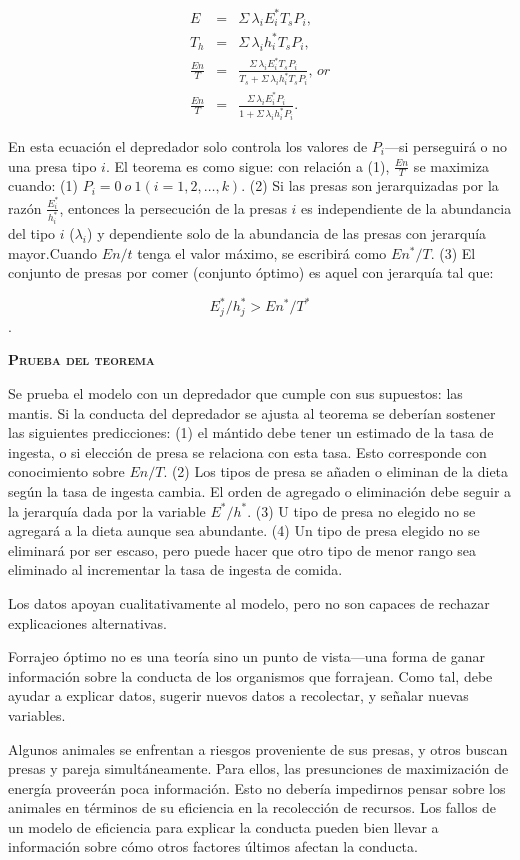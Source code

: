 \documentclass[a4paper,12pt]{article}
\begin{document}
\begin{eqnarray*}
        E&=&\Sigma\, \lambda_{i}E_{i}^{*}T_{s}P_{i},\\
        T_{h}&=&\Sigma\, \lambda_{i}h_{i}^{*}T_{s}P_{i},\\
        \frac{En}{T}&=&\frac{
                \Sigma\, \lambda_{i}E_{i}^{*}T_{s}P_{i}
        }{
                T_{s} + \Sigma\, \lambda_{i}h_{i}^{*}T_{s}P_{i}
        },\, or\\
        \frac{En}{T}&=&\frac{
                \Sigma\, \lambda_{i}E_{i}^{*}P_{i}
        }{
                1 + \Sigma\, \lambda_{i}h_{i}^{*}P_{i}
        }.
\end{eqnarray*}

En esta ecuación el depredador solo controla los valores de $P_{i}$---si perseguirá o no una presa tipo $i$. El teorema es como sigue: con relación a (1), $\frac{En}{T}$ se maximiza cuando: (1) $P_{i} = 0\ o\ 1 (i=1,2,\ldots, k)$. (2) Si las presas son jerarquizadas por la razón $\frac{E_{i}^{*}}{h_{i}^{*}}$, entonces la persecución de la presas $i$ es independiente de la abundancia del tipo $i$ ($\lambda_{i}$) y dependiente solo de la abundancia de las presas con jerarquía mayor.Cuando $En/t$ tenga el valor máximo, se escribirá como $En^{*}/T$. (3) El conjunto de presas por comer (conjunto óptimo) es aquel con jerarquía tal que:

\[
        E_{j}^{*}/h_{j}^{*} > En^{*}/T^{*}
\].

{\scshape\bfseries Prueba del teorema}

Se prueba el modelo con un depredador que cumple con sus supuestos: las mantis. Si la conducta del depredador se ajusta al teorema se deberían sostener las siguientes predicciones: (1) el mántido debe tener un estimado de la tasa de ingesta, o si elección de presa se relaciona con esta tasa. Esto corresponde con conocimiento sobre $En/T$. (2) Los tipos de presa se añaden o eliminan de la dieta según la tasa de ingesta cambia. El orden de agregado o eliminación debe seguir a la jerarquía dada por la variable $E^{*}/h^{*}$. (3) U tipo de presa no elegido no se agregará a la dieta aunque sea abundante. (4) Un tipo de presa elegido no se eliminará por ser escaso, pero puede hacer que otro tipo de menor rango sea eliminado al incrementar la tasa de ingesta de comida.

Los datos apoyan cualitativamente al modelo, pero no son capaces de rechazar explicaciones alternativas.

Forrajeo óptimo no es una teoría sino un punto de vista---una forma de ganar información sobre la conducta de los organismos que forrajean. Como tal, debe ayudar a explicar datos, sugerir nuevos datos a recolectar, y señalar nuevas variables.

Algunos animales se enfrentan a riesgos proveniente de sus presas, y otros buscan presas y pareja simultáneamente. Para ellos, las presunciones de maximización de energía proveerán poca información. Esto no debería impedirnos pensar sobre los animales en términos de su eficiencia en la recolección de recursos. Los fallos de un modelo de eficiencia para explicar la conducta pueden bien llevar a información sobre cómo otros factores últimos afectan la conducta.
\end{document}
